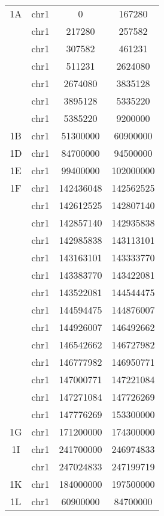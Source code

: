 \begin{center}
\begin{longtable}{@{\extracolsep{\fill}}cccc}
  \bottomrule
  \bottomrule
  \endlastfoot%
  1A     & chr1       & 0         & 167280 \\
         & chr1       & 217280    & 257582 \\
         & chr1       & 307582    & 461231 \\
         & chr1       & 511231    & 2624080 \\
         & chr1       & 2674080   & 3835128 \\
         & chr1       & 3895128   & 5335220 \\
         & chr1       & 5385220   & 9200000 \\
  1B     & chr1       & 51300000  & 60900000 \\
  1D     & chr1       & 84700000  & 94500000 \\
  1E     & chr1       & 99400000  & 102000000 \\
  1F     & chr1       & 142436048 & 142562525 \\
         & chr1       & 142612525 & 142807140 \\
         & chr1       & 142857140 & 142935838 \\
         & chr1       & 142985838 & 143113101 \\
         & chr1       & 143163101 & 143333770 \\
         & chr1       & 143383770 & 143422081 \\
         & chr1       & 143522081 & 144544475 \\
         & chr1       & 144594475 & 144876007 \\
         & chr1       & 144926007 & 146492662 \\
         & chr1       & 146542662 & 146727982 \\
         & chr1       & 146777982 & 146950771 \\
         & chr1       & 147000771 & 147221084 \\
         & chr1       & 147271084 & 147726269 \\
         & chr1       & 147776269 & 153300000 \\
  1G     & chr1       & 171200000 & 174300000 \\
  1I     & chr1       & 241700000 & 246974833 \\
         & chr1       & 247024833 & 247199719 \\
  1K     & chr1       & 184000000 & 197500000 \\
  1L     & chr1       & 60900000  & 84700000 \\

\end{longtable}
\end{center}
